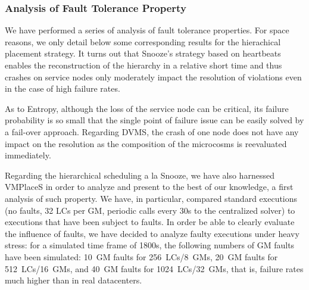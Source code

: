 

\subsubsection{Analysis of Fault Tolerance Property}
\label{subsubsec:node-crashes}
We have performed a series of analysis of fault tolerance
properties. For space reasons, we only detail below some corresponding
results for the hierachical placement strategy. It turns out that
Snooze's strategy based on heartbeats enables the reconstruction of
the hierarchy in a relative short time and thus crashes on service
nodes only moderately impact the resolution of violations even in the
case of high failure rates.

As to Entropy, although the loss of the service node can be critical,
its failure probability is so small that the single point of failure
issue can be easily solved by a fail-over approach.  Regarding DVMS,
the crash of one node does not have any impact on the resolution as
the composition of the microcosms is reevaluated immediately.



Regarding the hierarchical scheduling a la Snooze, we have also
harnessed VMPlaceS in order to analyze and present to the best of our
knowledge, a first analysis of such property.
We have, in particular, compared standard executions (no faults, 32
LCs per GM, periodic calls every 30s to the centralized solver) to
executions that have been subject to faults. In order be able to
clearly evaluate the influence of faults, we have decided to analyze
faulty executions under heavy stress: for a simulated time frame of
1800s, the following numbers of GM faults have been simulated: 10~GM
faults for 256~LCs/8~GMs, 20~GM faults for 512~LCs/16~GMs, and 40~GM
faults for 1024~LCs/32~GMs, that is, failure rates much higher than in
real datacenters.

